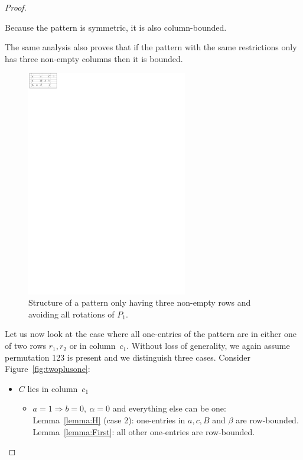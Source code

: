 \begin{proof}
\begin{itemize}
\begin{itemize}
\begin{itemize}
\begin{itemize}
								Because the pattern is symmetric, it is also column-bounded.
						\end{itemize}
				\end{itemize}
		\end{itemize}
\end{itemize}
The same analysis also proves that if the pattern with the same restrictions only has three non-empty columns then it is bounded.
\begin{figure}[!ht]
	\centering
	\includegraphics[width=70mm]{img/threelines.pdf}
	\caption{Structure of a pattern only having three non-empty rows and avoiding all rotations of $P_1$.}
	\label{fig:threelines}
\end{figure}

Let us now look at the case where all one-entries of the pattern are in either one of two rows $r_1,r_2$ or in column~$c_1$. Without loss of generality, we again assume permutation 123 is present and we distinguish three cases. Consider Figure~\ref{fig:twoplusone}:
\begin{itemize}
\item $C$ lies in column~$c_1$
	\begin{itemize}
		\item $a=1\Rightarrow b=0,\ \alpha=0$ and everything else can be one:\\
			Lemma~\ref{lemma:H} (case 2): one-entries in $a,c,B$ and $\beta$ are row-bounded.\\
			Lemma~\ref{lemma:First}: all other one-entries are row-bounded.\\
			

\end{itemize}
\end{itemize}
\end{proof}
